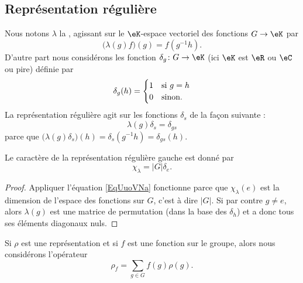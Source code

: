 \subsection{Représentation régulière}

Nous notons \( \lambda\) la , agissant sur le \( \eK\)-espace vectoriel des fonctions \( G\to \eK\) par
\begin{equation}
    \Big( \lambda(g)f \Big)(g)=f(g^{-1}h).
\end{equation}
D'autre part nous considérons les fonction \( \delta_g\colon G\to \eK\) (ici \( \eK\) est \( \eR\) ou \( \eC\) ou pire) définie par
\begin{equation}
    \delta_g(h)=\begin{cases}
        1    &   \text{si \( g=h\)}\\
        0    &    \text{sinon.}
    \end{cases}
\end{equation}
La représentation régulière agit sur les fonctions \( \delta_s\) de la façon suivante :
\begin{equation}
    \lambda(g)\delta_s=\delta_{gs}
\end{equation}
parce que \( \big( \lambda(g)\delta_s \big)(h)=\delta_s(g^{-1}h)=\delta_{gs}(h)\).

\begin{lemma}
    Le caractère de la représentation régulière gauche est donné par 
    \begin{equation}        \label{EqUuoVNa}
        \chi_{\lambda}=| G |\delta_e.
    \end{equation}
\end{lemma}

\begin{proof}
    Appliquer l'équation \eqref{EqUuoVNa} fonctionne parce que \( \chi_{\lambda}(e)\) est la dimension de l'espace des fonctions sur \( G\), c'est à dire \( | G |\). Si par contre \( g\neq e\), alors \( \lambda(g)\) est une matrice de permutation (dans la base des \( \delta_h\)) et a donc tous ses éléments diagonaux nuls.
\end{proof}

Si \( \rho\) est une représentation et si \( f\) est une fonction sur le groupe, alors nous considérons l'opérateur
\begin{equation}
    \rho_f=\sum_{g\in G}f(g)\rho(g).
\end{equation}

